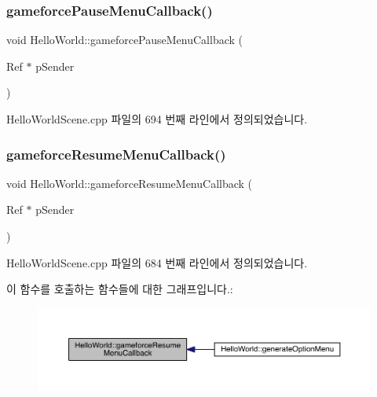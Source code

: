 \mbox{\label{class_hello_world_ac202dde4f557f0b9b6c3d150da4eec65}} 
\subsubsection{\texorpdfstring{gameforce\+Pause\+Menu\+Callback()}{gameforcePauseMenuCallback()}}
{\footnotesize\ttfamily void Hello\+World\+::gameforce\+Pause\+Menu\+Callback (\begin{DoxyParamCaption}\item[{Ref $\ast$}]{p\+Sender }\end{DoxyParamCaption})}



Hello\+World\+Scene.\+cpp 파일의 694 번째 라인에서 정의되었습니다.

\mbox{\label{class_hello_world_a9765d6e42b96bcf6c025ae1905bd7a90}} 
\subsubsection{\texorpdfstring{gameforce\+Resume\+Menu\+Callback()}{gameforceResumeMenuCallback()}}
{\footnotesize\ttfamily void Hello\+World\+::gameforce\+Resume\+Menu\+Callback (\begin{DoxyParamCaption}\item[{Ref $\ast$}]{p\+Sender }\end{DoxyParamCaption})}



Hello\+World\+Scene.\+cpp 파일의 684 번째 라인에서 정의되었습니다.

이 함수를 호출하는 함수들에 대한 그래프입니다.\+:
\nopagebreak
\begin{figure}[H]
\begin{center}
\leavevmode
\includegraphics[width=350pt]{class_hello_world_a9765d6e42b96bcf6c025ae1905bd7a90_icgraph}
\end{center}
\end{figure}
\mbox{\label{class_hello_world_af59f38fb445c1302e5d2f7e18d0ab0e5}} 
